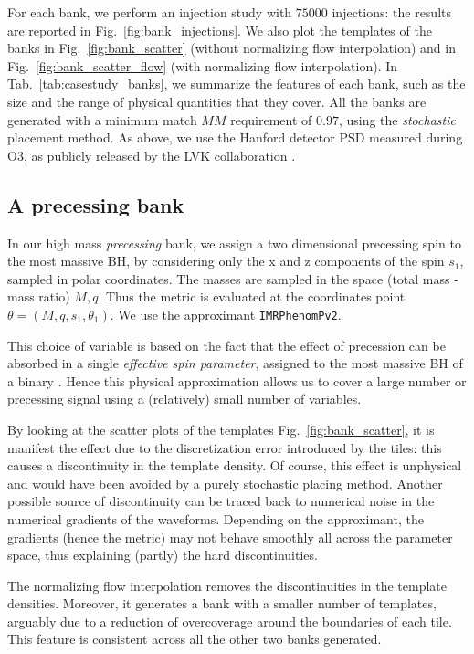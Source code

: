 \documentclass[twocolumn,showpacs,preprintnumbers,nofootinbib,prd,
superscriptaddress,10pt]{revtex4-2}
\begin{document}
For each bank, we perform an injection study with $75000$ injections: the results are reported in Fig.~\ref{fig:bank_injections}. We also plot the templates of the banks in Fig.~\ref{fig:bank_scatter} (without normalizing flow interpolation) and in Fig.~\ref{fig:bank_scatter_flow} (with normalizing flow interpolation).
In Tab.~\ref{tab:casestudy_banks}, we summarize the features of each bank, such as the size and the range of physical quantities that they cover.
All the banks are generated with a minimum match $MM$ requirement of $0.97$, using the {\it stochastic} placement method.
As above, we use the Hanford detector PSD measured during O3, as publicly released by the LVK collaboration \cite{O3a_PSDs}.

\subsection{A precessing bank}\label{sec:precessing_bank}
	
In our high mass {\it precessing} bank, we assign a two dimensional precessing spin to the most massive BH, by considering only the x and z components of the spin $s_1$, sampled in polar coordinates. The masses are sampled in the space (total mass - mass ratio) $M,q$.  Thus the metric is evaluated at the coordinates point $\theta = (M, q, s_1, \theta_1)$. We use the approximant \texttt{IMRPhenomPv2}.

This choice of variable is based on the fact that the effect of precession can be absorbed in a single {\it effective spin parameter}, assigned to the most massive BH of a binary \cite{PhysRevD.91.024043, PhysRevD.103.083022}. Hence this physical approximation allows us to cover a large number or precessing signal using a (relatively) small number of variables.

By looking at the scatter plots of the templates Fig.~\ref{fig:bank_scatter}, it is manifest the effect due to the discretization error introduced by the tiles: this causes a discontinuity in the template density. Of course, this effect is unphysical and would have been avoided by a purely stochastic placing method.
Another possible source of discontinuity can be traced back to numerical noise in the numerical gradients of the waveforms. Depending on the approximant, the gradients (hence the metric) may not behave smoothly all across the parameter space, thus explaining (partly) the hard discontinuities.

The normalizing flow interpolation removes the discontinuities in the template densities. Moreover, it generates a bank with a smaller number of templates, arguably due to a reduction of overcoverage around the boundaries of each tile. This feature is consistent across all the other two banks generated.
\end{document}

